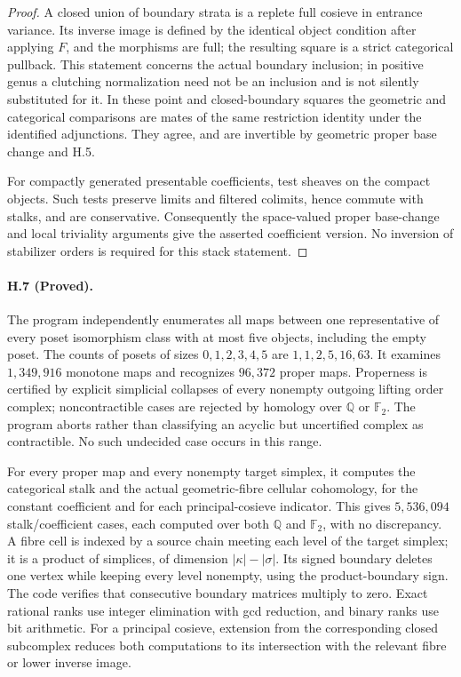 \begin{proof}
A closed union of boundary strata is a replete full cosieve in
entrance variance. Its inverse image is defined by the identical
object condition after applying $F$, and the morphisms are full;
the resulting square is a strict categorical pullback. This
statement concerns the actual boundary inclusion; in positive
genus a clutching normalization need not be an inclusion and is
not silently substituted for it. In these point and closed-boundary
squares the geometric and categorical comparisons are mates
of the same restriction identity under the identified adjunctions.
They agree, and are invertible by geometric proper base change
and H.5.

For compactly generated presentable coefficients, test sheaves
on the compact objects. Such tests preserve limits and filtered
colimits, hence commute with stalks, and are conservative.
Consequently the space-valued proper base-change and local
triviality arguments give the asserted coefficient version.
No inversion of stabilizer orders is required for this stack
statement.
\end{proof}

\paragraph{H.7 (Proved).}
The program 
independently enumerates all
maps between one representative of every poset isomorphism class
with at most five objects, including the empty poset. The counts
of posets of sizes $0,1,2,3,4,5$ are $1,1,2,5,16,63$.
It examines $1,349,916$ monotone maps and recognizes $96,372$
proper maps. Properness is certified by explicit simplicial
collapses of every nonempty outgoing lifting order complex;
noncontractible cases are rejected by homology over
$\mathbb Q$ or $\mathbb F_2$. The program aborts rather than
classifying an acyclic but uncertified complex as contractible.
No such undecided case occurs in this range.

For every proper map and every nonempty target simplex, it
computes the categorical stalk and the actual geometric-fibre
cellular cohomology, for the constant coefficient and for each
principal-cosieve indicator. This gives $5,536,094$
stalk/coefficient cases, each computed over both $\mathbb Q$
and $\mathbb F_2$, with no discrepancy. A fibre cell is indexed
by a source chain meeting each level of the target simplex;
it is a product of simplices, of dimension
$|\kappa|-|\sigma|$. Its signed boundary deletes one vertex
while keeping every level nonempty, using the product-boundary
sign. The code verifies that consecutive boundary matrices
multiply to zero. Exact rational ranks use integer elimination
with gcd reduction, and binary ranks use bit arithmetic.
For a principal cosieve, extension from the corresponding
closed subcomplex reduces both computations to its intersection
with the relevant fibre or lower inverse image.

